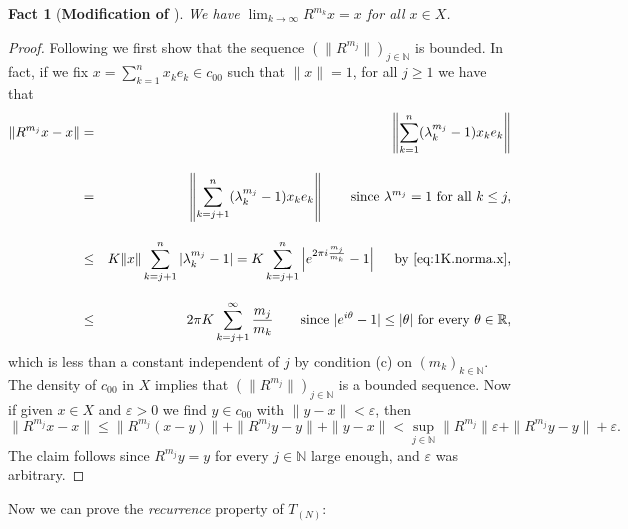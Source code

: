 \documentclass[openright,11pt]{article}
\theoremstyle{plain}
\newtheorem{fact}{Fact}[subsection]
\theoremstyle{definition}
\newcommand{\NN}{\mathbb{N}}
\newcommand{\RR}{\mathbb{R}}
\newcommand{\eps}{\varepsilon}
\begin{document}
\begin{fact}[\textbf{Modification of \cite[Lemma~3.4]{Auge2012}}]\label{Fact:R.rigid}
	We have $\displaystyle \lim_{k\to\infty} R^{m_k}x = x$ for all $x\in X$.
\end{fact}
\begin{proof}
	Following \cite[Lemma 3.4]{Auge2012} we first show that the sequence $(\|R^{m_j}\|)_{j\in\NN}$ is bounded. In fact, if we fix $x=\sum_{k=1}^n x_ke_k \in c_{00}$ such that $\|x\|=1$, for all $j\geq 1$ we have that
	\begin{eqnarray*}
		\|R^{m_j}x-x\| &=& \left\| \sum_{k=1}^n (\lambda_k^{m_j}-1)x_ke_k \right\| \nonumber\\[10pt]
		&=& \left\| \sum_{k=j+1}^n (\lambda_k^{m_j}-1)x_ke_k \right\| \qquad \text{since } \lambda^{m_j}=1 \text{ for all } k\leq j, \nonumber\\[10pt]
		&\leq& K \|x\| \sum_{k=j+1}^n |\lambda_k^{m_j}-1| = K \sum_{k=j+1}^n \left|e^{2\pi i \frac{m_j}{m_k}}-1\right| \quad \text{ by \eqref{eq:1K.norma.x},}\nonumber\\[10pt]
		&\leq& 2\pi K \sum_{k=j+1}^{\infty} \frac{m_j}{m_k} \qquad \text{since } |e^{i\theta}-1| \leq |\theta| \text{ for every } \theta \in \RR, \nonumber
	\end{eqnarray*}
	which is less than a constant independent of $j$ by condition (c) on $(m_k)_{k\in\NN}$. The density of $c_{00}$ in $X$ implies that $(\|R^{m_j}\|)_{j\in\NN}$ is a bounded sequence. Now if given $x \in X$ and $\eps>0$ we find $y \in c_{00}$ with $\|y-x\|<\eps$, then
	\[
	\|R^{m_j}x-x\| \leq \|R^{m_j}(x-y)\| + \|R^{m_j}y-y\| + \|y-x\| < \sup_{j\in\NN}\|R^{m_j}\|\eps + \|R^{m_j}y-y\| + \eps.
	\]
	The claim follows since $R^{m_j}y = y$ for every $j \in \NN$ large enough, and $\eps$ was arbitrary.
\end{proof}

Now we can prove the {\em recurrence} property of $T_{(N)}$:
\end{document}
